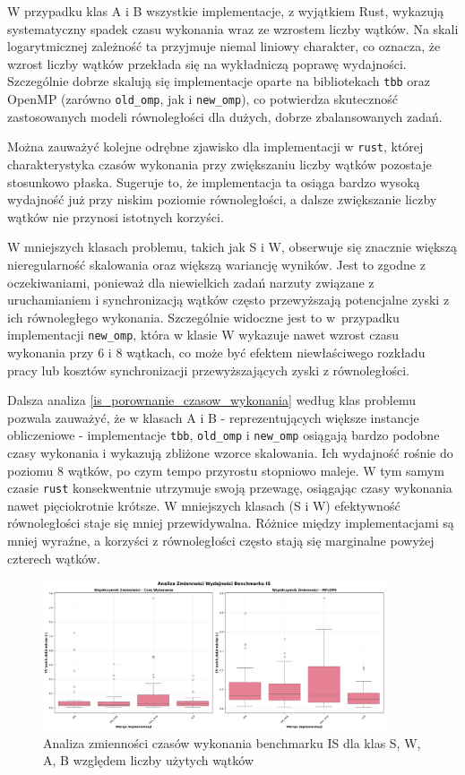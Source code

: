 W przypadku klas A i B wszystkie implementacje, z wyjątkiem Rust, wykazują systematyczny spadek czasu wykonania wraz ze wzrostem liczby wątków. Na skali logarytmicznej zależność ta przyjmuje niemal liniowy charakter, co oznacza, że wzrost liczby wątków przekłada się na wykładniczą poprawę wydajności. Szczególnie dobrze skalują się implementacje oparte na bibliotekach \texttt{tbb} oraz OpenMP (zarówno \texttt{old\_omp}, jak i \texttt{new\_omp}), co potwierdza skuteczność zastosowanych modeli równoległości dla dużych, dobrze zbalansowanych zadań.

Można zauważyć kolejne odrębne zjawisko dla implementacji w \texttt{rust}, której charakterystyka czasów wykonania przy zwiększaniu liczby wątków pozostaje stosunkowo płaska. Sugeruje to, że implementacja ta osiąga bardzo wysoką wydajność już przy niskim poziomie równoległości, a dalsze zwiększanie liczby wątków nie przynosi istotnych korzyści.

W mniejszych klasach problemu, takich jak S i W, obserwuje się znacznie większą nieregularność skalowania oraz większą wariancję wyników. Jest to zgodne z oczekiwaniami, ponieważ dla niewielkich zadań narzuty związane z uruchamianiem i synchronizacją wątków często przewyższają potencjalne zyski z ich równoległego wykonania. Szczególnie widoczne jest to w~przypadku implementacji \texttt{new\_omp}, która w klasie W wykazuje nawet wzrost czasu wykonania przy 6 i 8 wątkach, co może być efektem niewłaściwego rozkładu pracy lub kosztów synchronizacji przewyższających zyski z równoległości.

Dalsza analiza \ref{is_porownanie_czasow_wykonania} według klas problemu pozwala zauważyć, że w klasach A i B - reprezentujących większe instancje obliczeniowe - implementacje \texttt{\texttt{tbb}}, \texttt{old\_omp} i \texttt{new\_omp} osiągają bardzo podobne czasy wykonania i wykazują zbliżone wzorce skalowania. Ich wydajność rośnie do poziomu 8 wątków, po czym tempo przyrostu stopniowo maleje. W tym samym czasie \texttt{rust} konsekwentnie utrzymuje swoją przewagę, osiągając czasy wykonania nawet pięciokrotnie krótsze. W mniejszych klasach (S i W) efektywność równoległości staje się mniej przewidywalna. Różnice między implementacjami są mniej wyraźne, a korzyści z równoległości często stają się marginalne powyżej czterech wątków.

\begin{figure}[H]
    \centering
    \includegraphics[width=0.9\textwidth]{analiza/images/parallel/is/arm/is_analiza_zmiennosci.png}
    \caption{Analiza zmienności czasów wykonania benchmarku IS dla klas S, W, A, B względem liczby użytych wątków}
    \label{is_analiza_zmiennosci}
\end{figure}

